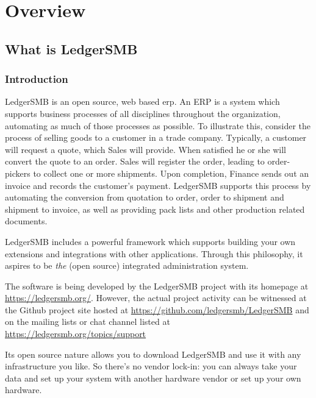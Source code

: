 
\part{Overview}
\label{part-overview}


\chapter{What is LedgerSMB}
\label{cha-what-is-ledgersmb}

\section{Introduction}
\label{sec-ledgersmb-introduction}
LedgerSMB is an open source, web based \gls{erp}. An \gls{ERP} is a system
which supports business processes of all disciplines throughout the
organization, automating as much of those processes as possible. To
illustrate this, consider the process of selling goods to a customer
in a trade company. Typically, a customer will request a quote, which
Sales will provide. When satisfied he or she will convert the quote
to an order. Sales will register the order, leading to order-pickers
to collect one or more shipments. Upon completion, Finance sends
out an invoice and records the customer's payment. LedgerSMB supports
this process by automating the conversion from quotation to order,
order to shipment and shipment to invoice, as well as providing
pack lists and other production related documents.

LedgerSMB includes a
powerful framework which supports building your own extensions and
integrations with other applications. Through this philosophy, it
aspires to be \emph{the} (open source) integrated administration system.

The software is being developed by the LedgerSMB project with its
homepage at \url{https://ledgersmb.org/}.
However, the actual project activity can be witnessed at the Github
project site hosted at \url{https://github.com/ledgersmb/LedgerSMB} and
on the mailing lists or chat channel 
listed at \url{https://ledgersmb.org/topics/support}

Its open source nature allows you to download LedgerSMB and use it with any
infrastructure you like. So there's no vendor lock-in: you can
always take your data and set up your system with another hardware vendor
or set up your own hardware.

